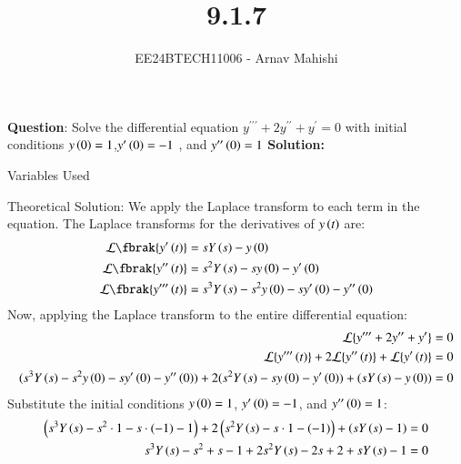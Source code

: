 \documentclass[journal]{IEEEtran}
\begin{document}

\vspace{3cm}

\title{9.1.7}
\author{EE24BTECH11006 - Arnav Mahishi}
{\let\newpage\relax\maketitle}

\renewcommand{\thefigure}{\theenumi}
\renewcommand{\thetable}{\theenumi}
\setlength{\intextsep}{10pt} %


\renewcommand{\thetable}{\theenumi}


\textbf{Question}:\newline
Solve the differential equation $y^{\prime\prime\prime}+2y^{\prime\prime}+y^{\prime} = 0$ with initial conditions $y\left(0\right) = 1$,$y^{\prime}\left(0\right) = -1$ , and $y^{\prime\prime}\left(0\right) = 1$
\newline
\textbf{Solution: }
\begin{table}[h!]    
  \centering
  
  \caption{Variables Used}
  \label{tab1.1.2.2}
\end{table}
\newline
Theoretical Solution:
We apply the Laplace transform to each term in the equation. The Laplace transforms for the derivatives of $y\left(t\right)$ are:
\begin{align}
\mathcal{L}\fbrak{y^{\prime}\brak{t}} &= sY\brak{s} - y\brak{0} \\
\mathcal{L}\fbrak{y^{\prime\prime}\brak{t}} &= s^2Y\brak{s} - sy\brak{0} - y^{\prime}\brak{0} \\
\mathcal{L}\fbrak{y^{\prime\prime\prime}\brak{t}} &= s^3Y\brak{s} - s^2 y\brak{0} - sy^{\prime}\brak{0} - y^{\prime\prime}\brak{0}
\end{align}
Now, applying the Laplace transform to the entire differential equation:
\begin{align}
\mathcal{L}\{y^{\prime\prime\prime} + 2y^{\prime\prime} + y^{\prime}\} = 0\\
\mathcal{L}\{y^{\prime\prime\prime}\left(t\right)\} + 2\mathcal{L}\{y^{\prime\prime}\left(t\right)\} + \mathcal{L}\{y^{\prime}\left(t\right)\} = 0 \\
(s^3 Y\left(s\right) - s^2 y\left(0\right) - s y^{\prime}\left(0\right) - y^{\prime\prime}\left(0\right)) + 2(s^2 Y\left(s\right) - s y\left(0\right) - y^{\prime}\left(0\right)) + (s Y\left(s\right) - y\left(0\right)) = 0
\end{align}
Substitute the initial conditions $y\left(0\right) = 1$, $y^{\prime}\left(0\right) = -1$, and $y^{\prime\prime}\left(0\right) = 1$:
\begin{align}
\left(s^3 Y\left(s\right) - s^2 \cdot 1 - s \cdot (-1) - 1\right) + 2\left(s^2 Y\left(s\right) - s \cdot 1 - (-1)\right) + \left(s Y\left(s\right) - 1\right) &= 0 \\
s^3 Y\left(s\right) - s^2 + s - 1 + 2s^2 Y\left(s\right) - 2s + 2 + s Y\left(s\right) - 1 &= 0
\end{align}
\end{document}
